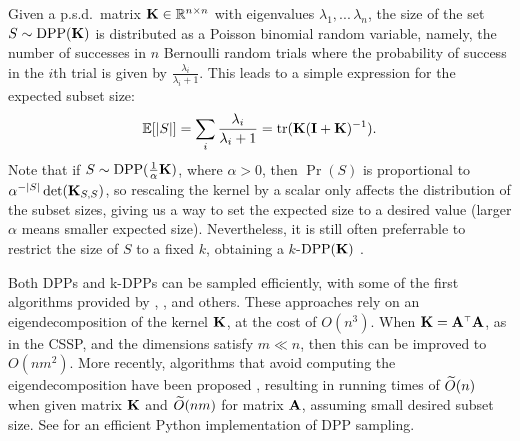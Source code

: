 \documentclass{article}
\begin{document}
Given a p.s.d.~matrix $\mathbf K \in \mathbb R^{n \times n}$ with eigenvalues
$\lambda_1,...\, \lambda_n$, the size of the set $S \sim {\mathrm{DPP}}(\mathbf K)$
is distributed as a Poisson binomial random variable, namely, the
number of successes in $n$ Bernoulli random trials where the
probability of success in the $i$th trial is given by 
$\frac{\lambda_i}{\lambda_i+1}$. This leads to a simple
expression for the expected subset size:
\begin{align}
\mathbb E[|S|] = \sum_i \frac{\lambda_i}{\lambda_i + 1} = \mathrm{tr}(\mathbf K(\mathbf I + \mathbf K)^{-1}).\label{eq:size}
\end{align}
Note that if $S\sim{\mathrm{DPP}}(\frac1\alpha\mathbf K)$, where $\alpha>0$, then
$\Pr(S)$ is proportional to $\alpha^{-|S|}\det(\mathbf K_{S,S})$, so rescaling the kernel
by a scalar only affects the distribution of the subset sizes, giving
us a way to set the expected size to a desired value (larger $\alpha$
means smaller expected size).
Nevertheless, it is still often preferrable to restrict the size of
$S$ to a fixed $k$, obtaining a $k$-${\mathrm{DPP}}(\mathbf K)$ \citep{k-dpp}.

Both DPPs and k-DPPs can be sampled efficiently, with some of the
first algorithms provided by
\citet{dpp-independence},
\citet{efficient-volume-sampling}, \citet{k-dpp} and others. These
approaches rely on an eigendecomposition of the kernel $\mathbf K$, at the cost of $O(n^3)$. When
$\K=\A^\top\A$, as in the CSSP, and the dimensions satisfy $m\ll n$, then this can be improved
to $O(nm^2)$. More recently, algorithms that avoid computing the
eigendecomposition have been proposed
\citep{dpp-intermediate,dpp-sublinear,alpha-dpp,rayleigh-mcmc},
resulting in running times of $\widetilde{O}(n)$ when given matrix $\mathbf K$ and
$\widetilde{O}(nm)$ for matrix $\mathbf A$, assuming small desired subset size.
See \citet{dppy} for an efficient Python implementation of DPP sampling.
\end{document}
